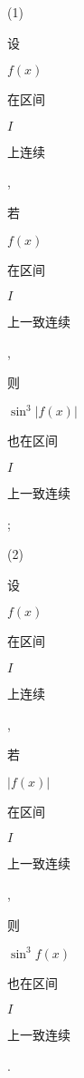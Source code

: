 \documentclass[10pt]{article}
\begin{document}
(1) \begin{CJK}{UTF8}{mj}设\end{CJK} $f(x)$ \begin{CJK}{UTF8}{mj}在区间\end{CJK} $I$ \begin{CJK}{UTF8}{mj}上连续\end{CJK}, \begin{CJK}{UTF8}{mj}若\end{CJK} $f(x)$ \begin{CJK}{UTF8}{mj}在区间\end{CJK} $I$ \begin{CJK}{UTF8}{mj}上一致连续\end{CJK}, \begin{CJK}{UTF8}{mj}则\end{CJK} $\sin ^{3}|f(x)|$ \begin{CJK}{UTF8}{mj}也在区间\end{CJK} $I$ \begin{CJK}{UTF8}{mj}上一致连续\end{CJK};

(2) \begin{CJK}{UTF8}{mj}设\end{CJK} $f(x)$ \begin{CJK}{UTF8}{mj}在区间\end{CJK} $I$ \begin{CJK}{UTF8}{mj}上连续\end{CJK}, \begin{CJK}{UTF8}{mj}若\end{CJK} $|f(x)|$ \begin{CJK}{UTF8}{mj}在区间\end{CJK} $I$ \begin{CJK}{UTF8}{mj}上一致连续\end{CJK}, \begin{CJK}{UTF8}{mj}则\end{CJK} $\sin ^{3} f(x)$ \begin{CJK}{UTF8}{mj}也在区间\end{CJK} $I$ \begin{CJK}{UTF8}{mj}上一致连续\end{CJK}.
\end{document}
